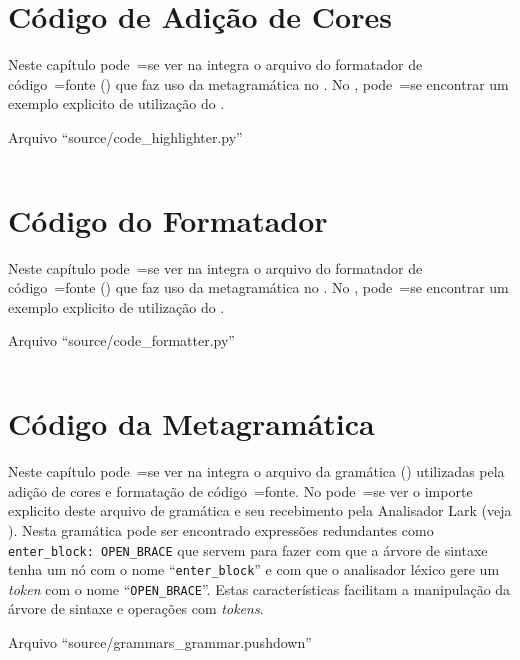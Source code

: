 \chapter{Código de Adição de Cores}

Neste capítulo pode~=se ver na integra o arquivo do formatador de código~=fonte () que faz uso da metagramática no .
No ,
pode~=se encontrar um exemplo explicito de utilização do .
\begin{code}
\caption{Arquivo ``source/code\_highlighter.py''}
\label{codeHighlighterPy}
\inputminted{python3}{../source/code_highlighter.py}
\end{code}


\chapter{Código do Formatador}

Neste capítulo pode~=se ver na integra o arquivo do formatador de código~=fonte () que faz uso da metagramática no .
No ,
pode~=se encontrar um exemplo explicito de utilização do .
\begin{code}
\caption{Arquivo ``source/code\_formatter.py''}
\label{codeFormatterPy}
\inputminted{python3}{../source/code_formatter.py}
\end{code}


\chapter{Código da Metagramática}

Neste capítulo pode~=se ver na integra o arquivo da gramática () utilizadas pela adição de cores e
formatação de código~=fonte.
No  pode~=se ver o importe explicito deste arquivo de gramática e
seu recebimento pela Analisador Lark (veja ).
Nesta gramática pode ser encontrado expressões redundantes como \texttt{enter_block:
OPEN_BRACE} que servem para fazer com que a árvore de sintaxe tenha um nó com o nome ``\texttt{enter_block}'' e
com que o analisador léxico gere um \textit{token} com o nome ``\texttt{OPEN_BRACE}''.
Estas características facilitam a manipulação da árvore de sintaxe e
operações com \textit{tokens}.
\begin{code}
\caption{Arquivo ``source/grammars\_grammar.pushdown''}
\label{grammarsGrammarPushdown}
\inputminted{antlr}{../source/grammars_grammar.pushdown}
\end{code}
